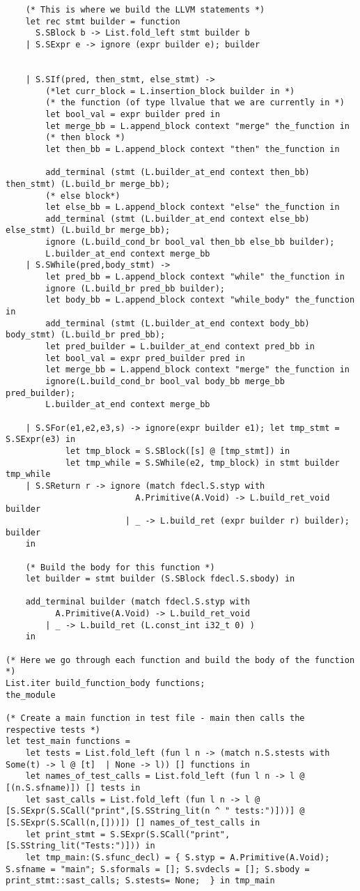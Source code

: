\documentclass{article}
\begin{document}
\begin{lstlisting}
	(* This is where we build the LLVM statements *)
	let rec stmt builder = function 
	  S.SBlock b -> List.fold_left stmt builder b
	| S.SExpr e -> ignore (expr builder e); builder
	
	
	| S.SIf(pred, then_stmt, else_stmt) -> 
		(*let curr_block = L.insertion_block builder in *)
		(* the function (of type llvalue that we are currently in *)
		let bool_val = expr builder pred in
		let merge_bb = L.append_block context "merge" the_function in
		(* then block *)
		let then_bb = L.append_block context "then" the_function in

		add_terminal (stmt (L.builder_at_end context then_bb) then_stmt) (L.build_br merge_bb);
		(* else block*)
		let else_bb = L.append_block context "else" the_function in 
		add_terminal (stmt (L.builder_at_end context else_bb) else_stmt) (L.build_br merge_bb);	
		ignore (L.build_cond_br bool_val then_bb else_bb builder);
		L.builder_at_end context merge_bb
	| S.SWhile(pred,body_stmt) ->  
		let pred_bb = L.append_block context "while" the_function in
		ignore (L.build_br pred_bb builder);
		let body_bb = L.append_block context "while_body" the_function in
		add_terminal (stmt (L.builder_at_end context body_bb) body_stmt) (L.build_br pred_bb);
		let pred_builder = L.builder_at_end context pred_bb in
		let bool_val = expr pred_builder pred in
		let merge_bb = L.append_block context "merge" the_function in
		ignore(L.build_cond_br bool_val body_bb merge_bb pred_builder);	
		L.builder_at_end context merge_bb

	| S.SFor(e1,e2,e3,s) -> ignore(expr builder e1); let tmp_stmt = S.SExpr(e3) in 
			let tmp_block = S.SBlock([s] @ [tmp_stmt]) in  
			let tmp_while = S.SWhile(e2, tmp_block) in stmt builder tmp_while 
	| S.SReturn r -> ignore (match fdecl.S.styp with
						  A.Primitive(A.Void) -> L.build_ret_void builder
						| _ -> L.build_ret (expr builder r) builder); builder 
	in
	
	(* Build the body for this function *)
	let builder = stmt builder (S.SBlock fdecl.S.sbody) in
		
	add_terminal builder (match fdecl.S.styp with
          A.Primitive(A.Void) -> L.build_ret_void
        | _ -> L.build_ret (L.const_int i32_t 0) )
	in
	
(* Here we go through each function and build the body of the function *)
List.iter build_function_body functions;
the_module

(* Create a main function in test file - main then calls the respective tests *)
let test_main functions = 
	let tests = List.fold_left (fun l n -> (match n.S.stests with Some(t) -> l @ [t]  | None -> l)) [] functions in 
	let names_of_test_calls = List.fold_left (fun l n -> l @ [(n.S.sfname)]) [] tests in
	let sast_calls = List.fold_left (fun l n -> l @ [S.SExpr(S.SCall("print",[S.SString_lit(n ^ " tests:")]))] @ [S.SExpr(S.SCall(n,[]))]) [] names_of_test_calls in
	let print_stmt = S.SExpr(S.SCall("print",[S.SString_lit("Tests:")])) in 
	let tmp_main:(S.sfunc_decl) = { S.styp = A.Primitive(A.Void); S.sfname = "main"; S.sformals = []; S.svdecls = []; S.sbody = print_stmt::sast_calls; S.stests= None;  } in tmp_main



\end{lstlisting}
\end{document}
